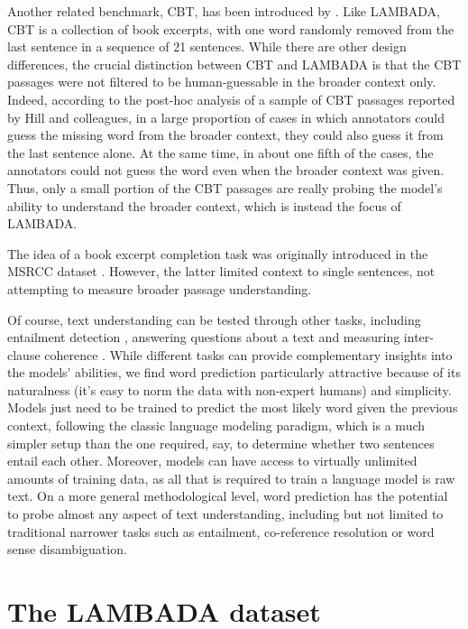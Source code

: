 Another related benchmark, CBT, has been introduced by
. Like LAMBADA, CBT is a collection of book excerpts, with one word randomly removed from the last sentence in a sequence of 21 sentences. While there are other design differences, the crucial distinction between CBT and LAMBADA is that the CBT passages were not filtered to be human-guessable in the broader context only. Indeed, according to the post-hoc analysis of a sample of CBT passages reported by Hill and colleagues, in a large proportion of cases in which annotators could guess the missing word from the broader context, they could also guess it from the last sentence alone. At the same time, in about one fifth of the cases, the annotators could not guess the word even when the broader context was given. Thus, only a small portion of the CBT passages are really probing the model's ability to understand the broader context, which is instead the focus of LAMBADA.

The idea of a book excerpt completion task was originally introduced in the MSRCC dataset \cite{Zweig:Burges:2011}. However, the latter limited context to single sentences, not attempting to measure broader passage understanding.

Of course, text understanding can be tested through other tasks, including entailment detection \cite{Bowman:etal:2015}, answering questions about a text \cite{Richardson:etal:2013,Weston:etal:2015b} and measuring inter-clause coherence \cite{Yin:Schuetze:2015}. While different tasks can provide complementary insights into the models' abilities, we find word prediction particularly attractive because of its naturalness (it's easy to norm the data with non-expert humans) and simplicity. Models just need to be trained to predict the most likely word given the previous context, following the classic language modeling paradigm, which is a much simpler setup than the one required, say, to determine whether two sentences entail each other. Moreover, models can have access to virtually unlimited amounts of training data, as all that is required to train a language model is raw text.  On a more general methodological level, word prediction has the potential to probe almost any aspect of text understanding, including but not limited to traditional narrower tasks such as entailment, co-reference resolution or word sense disambiguation.

\section{The LAMBADA dataset}
\label{sec:the-dataset}

